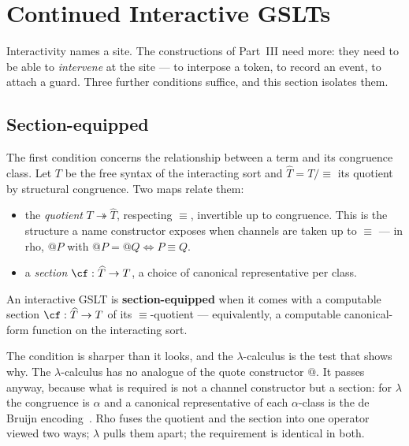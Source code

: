 \chapter{Continued Interactive GSLTs}
\label{ch:cigslt}

Interactivity names a site. The constructions of Part~III need more: they need to be
able to \emph{intervene} at the site --- to interpose a token, to record an event, to
attach a guard. Three further conditions suffice, and this section isolates them.

\section{Section-equipped}

The first condition concerns the relationship between a term and its congruence class.
Let $T$ be the free syntax of the interacting sort and $\widehat{T} = T/{\equiv}$ its
quotient by structural congruence. Two maps relate them:

\begin{itemize}[leftmargin=2em]
  \item the \emph{quotient} $T \twoheadrightarrow \widehat{T}$, respecting $\equiv$,
    invertible up to congruence. This is the structure a name constructor exposes when
    channels are taken up to $\equiv$ --- in rho, $@P$ with $@P = @Q \iff P \equiv Q$.
  \item a \emph{section} $\cf : \widehat{T} \to T$, a choice of canonical representative
    per class.
\end{itemize}

\begin{definition}
\label{ob:def:section}
An interactive GSLT is \textbf{section-equipped} when it comes with a computable section
$\cf : \widehat{T} \to T$ of its $\equiv$-quotient --- equivalently, a computable
canonical-form function on the interacting sort.
\end{definition}

The condition is sharper than it looks, and the $\lambda$-calculus is the test that
shows why. The $\lambda$-calculus has no analogue of the quote constructor $@$. It
passes anyway, because what is required is not a channel constructor but a section: for
$\lambda$ the congruence is $\alpha$ and a canonical representative of each
$\alpha$-class is the de Bruijn encoding~\cite{deBruijn1972}. Rho fuses the quotient and
the section into one operator viewed two ways; $\lambda$ pulls them apart; the
requirement is identical in both.

